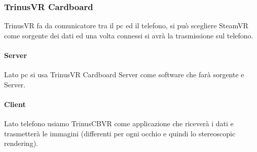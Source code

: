 \documentclass[8pt]{extarticle}
\begin{document}
\begin{multicols}{3}
\subsubsection{TrinusVR Cardboard}
TrinusVR fa da comunicatore tra il pc ed il telefono, si può scegliere SteamVR come 
sorgente dei dati ed una volta connessi si avrà la trasmissione sul telefono.
\paragraph{Server}
Lato pc si usa TrinusVR Cardboard Server come software che farà sorgente e Server.
\paragraph{Client} 
Lato telefono usiamo TrinusCBVR come applicazione che riceverà i dati e trasmetterà
le immagini (differenti per ogni occhio e quindi lo stereoscopic rendering).







\end{multicols}
\end{document}
